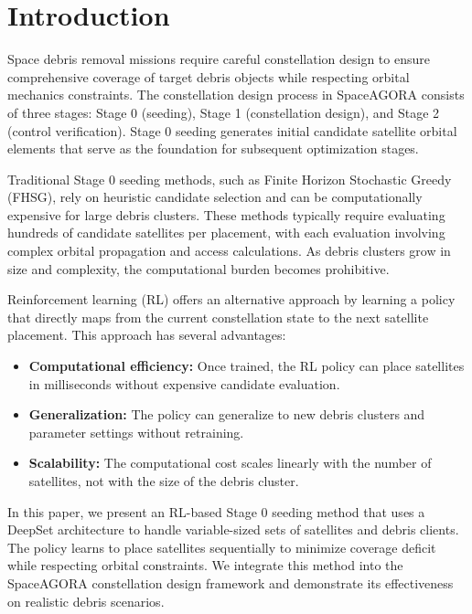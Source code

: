 \section{Introduction}

Space debris removal missions require careful constellation design to ensure comprehensive coverage of target debris objects while respecting orbital mechanics constraints. The constellation design process in SpaceAGORA consists of three stages: Stage 0 (seeding), Stage 1 (constellation design), and Stage 2 (control verification). Stage 0 seeding generates initial candidate satellite orbital elements that serve as the foundation for subsequent optimization stages.

Traditional Stage 0 seeding methods, such as Finite Horizon Stochastic Greedy (FHSG), rely on heuristic candidate selection and can be computationally expensive for large debris clusters. These methods typically require evaluating hundreds of candidate satellites per placement, with each evaluation involving complex orbital propagation and access calculations. As debris clusters grow in size and complexity, the computational burden becomes prohibitive.

Reinforcement learning (RL) offers an alternative approach by learning a policy that directly maps from the current constellation state to the next satellite placement. This approach has several advantages:
\begin{itemize}
    \item \textbf{Computational efficiency:} Once trained, the RL policy can place satellites in milliseconds without expensive candidate evaluation.
    \item \textbf{Generalization:} The policy can generalize to new debris clusters and parameter settings without retraining.
    \item \textbf{Scalability:} The computational cost scales linearly with the number of satellites, not with the size of the debris cluster.
\end{itemize}

In this paper, we present an RL-based Stage 0 seeding method that uses a DeepSet architecture to handle variable-sized sets of satellites and debris clients. The policy learns to place satellites sequentially to minimize coverage deficit while respecting orbital constraints. We integrate this method into the SpaceAGORA constellation design framework and demonstrate its effectiveness on realistic debris scenarios.

